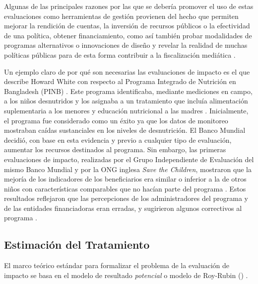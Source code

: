 \documentclass[../../main.tex]{subfiles}
\begin{document}
Algunas de las principales razones por las que se debería promover el uso de estas evaluaciones como herramientas de gestión provienen del hecho que permiten mejorar la rendición de cuentas, la inversión de recursos públicos o la efectividad de una política, obtener financiamiento, como así también probar modalidades de programas alternativos o innovaciones de diseño \cite{gertler-2016} y revelar la realidad de muchas políticas públicas para de esta forma contribuir a la fiscalización mediática \cite{bernal}.

Un ejemplo claro de por qué son necesarias las evaluaciones de impacto es el que describe Howard White con respecto al Programa Integrado de Nutrición en Bangladesh (PINB) \cite{white2009theory}. Este programa identificaba, mediante mediciones en campo, a los niños desnutridos y los asignaba a un tratamiento que incluía alimentación suplementaria a los menores y educación nutricional a las madres \cite{bernal}. Inicialmente, el programa fue considerado como un éxito ya que los datos de monitoreo mostraban caídas sustanciales en los niveles de desnutrición. El Banco Mundial decidió, con base en esta evidencia y previo a cualquier tipo de evaluación, aumentar los recursos destinados al programa. Sin embargo, las primeras evaluaciones de impacto, realizadas por el Grupo Independiente de Evaluación del mismo Banco Mundial y por la ONG inglesa \textit{Save the Children}, mostraron que la mejoría de los indicadores de los beneficiarios era similar o inferior a la de otros niños con características comparables que no hacían parte del programa \cite{bernal}. Estos resultados reflejaron que las percepciones de los administradores del programa y de las entidades financiadoras eran erradas, y sugirieron algunos correctivos al programa \cite{bernal}.

\subsection{Estimación del Tratamiento}
El marco teórico estándar para formalizar el problema de la evaluación de impacto se basa en el modelo de resultado \textit{potencial} o modelo de Roy-Rubin (\cite{rubin1974}) \cite{bernal}. 
\end{document}
